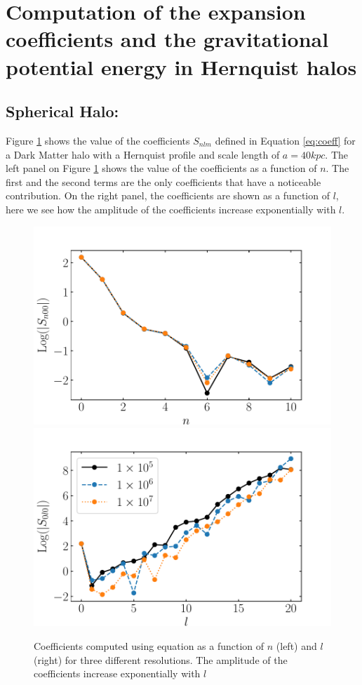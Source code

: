 \documentclass[14pt]{article}
\begin{document}
\section{Computation of the expansion coefficients and the gravitational
potential energy in Hernquist halos}
\subsection{Spherical Halo:}

Figure \ref{fig:coeff_hernquist} shows the value of the coefficients $S_{nlm}$
defined in Equation \ref{eq:coeff} for a Dark
Matter halo with a Hernquist profile and scale length of $a= 40 kpc$. The left
panel on Figure \ref{fig:coeff_hernquist} shows the value of the
coefficients as a function of $n$. The first and the second terms are the
only coefficients that have a noticeable contribution. On the right panel, the
coefficients are shown as a function of $l$, here we see how the amplitude of
the coefficients increase exponentially with $l$. 

\begin{figure}[H]
  \centering
  \includegraphics[scale=0.5]{../code/S_n_henrquist.pdf}
  \includegraphics[scale=0.5]{../code/S_l_henrquist.pdf}
  \caption{Coefficients computed using equation \label{eq:coeff} as a function
  of $n$ (left) and $l$ (right) for three different resolutions. The amplitude of the coefficients increase
  exponentially with $l$} \label{fig:coeff_hernquist}
\end{figure}
\end{document}
